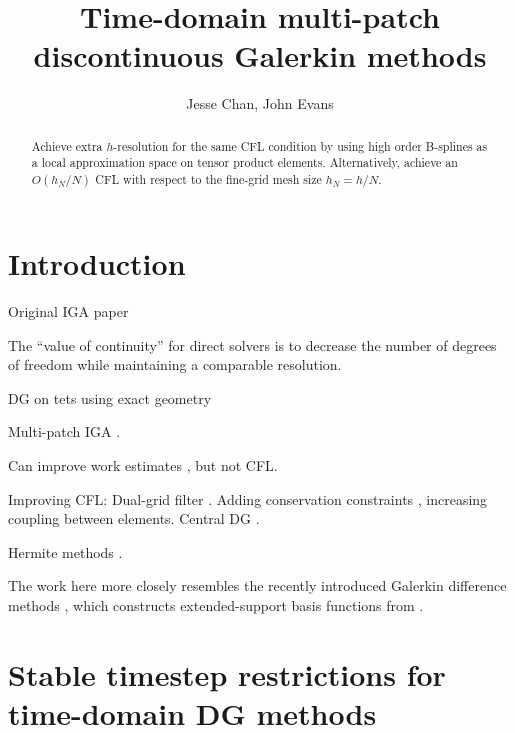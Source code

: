 \documentclass{siamart0216}
\date{}
\author{Jesse Chan, John Evans}
\title{Time-domain multi-patch discontinuous Galerkin methods}
\begin{document}
\maketitle

\begin{abstract}

Achieve extra $h$-resolution for the same CFL condition by using high order B-splines as a local approximation space on tensor product elements.  Alternatively, achieve an $O(h_N/N)$ CFL with respect to the fine-grid mesh size $h_N = h/N$.  




\end{abstract}

\tableofcontents

\section{Introduction}



Original IGA paper \cite{hughes2005isogeometric}

The ``value of continuity'' for direct solvers \cite{garcia2016value} is to decrease the number of degrees of freedom while maintaining a comparable resolution.  

DG on tets using exact geometry \cite{michoski2015foundations}

Multi-patch IGA \cite{langer2015multipatch,langer2016discontinuous}.  


Can improve work estimates \cite{chan2015bbdg}, but not CFL.  

Improving CFL: Dual-grid filter \cite{warburton2008taming}.  Adding conservation constraints \cite{xu2010conservation,xu2014new}, increasing coupling between elements.  Central DG \cite{reyna2014operator}.  

Hermite methods \cite{goodrich2006hermite,vargas2015variations}.  

The work here more closely resembles the recently introduced Galerkin difference methods \cite{banks2016galerkin}, which constructs extended-support basis functions from .  

\section{Stable timestep restrictions for time-domain DG methods}
\end{document}
